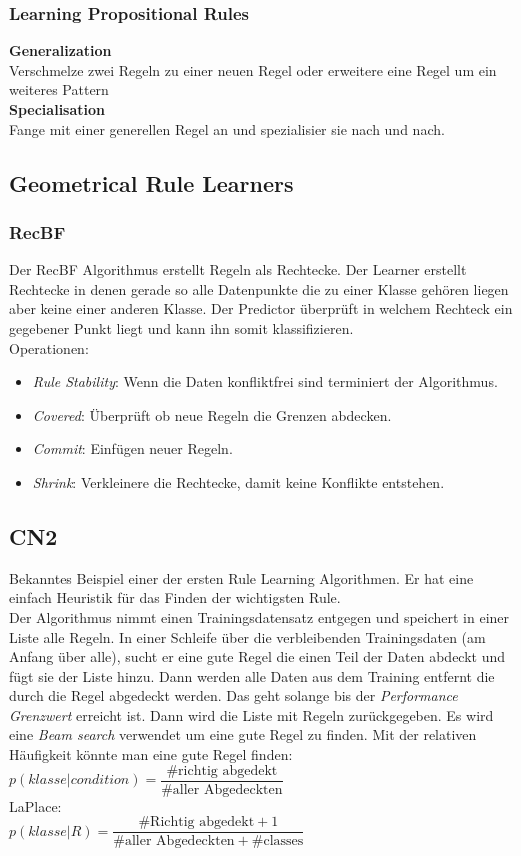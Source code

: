 \documentclass[a4paper]{scrartcl}
\begin{document}
\subsubsection{Learning Propositional Rules}
\textbf{Generalization}\\
Verschmelze zwei Regeln zu einer neuen Regel oder erweitere eine Regel um ein weiteres Pattern\\
\textbf{Specialisation}\\
Fange mit einer generellen Regel an und spezialisier sie nach und nach.

\subsection{Geometrical Rule Learners}
\subsubsection{RecBF}
Der RecBF Algorithmus erstellt Regeln als Rechtecke. Der Learner erstellt Rechtecke in denen gerade so alle Datenpunkte die zu einer Klasse gehören liegen aber keine einer anderen Klasse. Der Predictor überprüft in welchem Rechteck ein gegebener Punkt liegt und kann ihn somit klassifizieren.\\
Operationen:
\begin{itemize}
\setlength{\parskip}{-2pt}
\item \textit{Rule Stability}: Wenn die Daten konfliktfrei sind terminiert der Algorithmus.
\item \textit{Covered}: Überprüft ob neue Regeln die Grenzen abdecken.
\item \textit{Commit}: Einfügen neuer Regeln.
\item \textit{Shrink}: Verkleinere die Rechtecke, damit keine Konflikte entstehen.
\end{itemize}

\subsection{CN2}
Bekanntes Beispiel einer der ersten Rule Learning Algorithmen. Er hat eine einfach Heuristik für das Finden der wichtigsten Rule.\\
Der Algorithmus nimmt einen Trainingsdatensatz entgegen und speichert in einer Liste alle Regeln. 
In einer Schleife über die verbleibenden Trainingsdaten (am Anfang über alle), sucht er eine gute Regel die einen Teil der Daten abdeckt und fügt sie der Liste hinzu. Dann werden alle Daten aus dem Training entfernt die durch die Regel abgedeckt werden. Das geht solange bis der \textit{Performance Grenzwert} erreicht ist. Dann wird die Liste mit Regeln zurückgegeben. Es wird eine \textit{Beam search} verwendet um eine gute Regel zu finden. Mit der relativen Häufigkeit könnte man eine gute Regel finden:\\
$p(klasse|condition) = \dfrac{\#\mbox{richtig abgedekt}}{\#\mbox{aller Abgedeckten}}$\\
LaPlace:\\
$p(klasse|R) = \dfrac{\#\mbox{Richtig abgedekt} +1}{\#\mbox{aller Abgedeckten}+\#\mbox{classes}}$\\
\end{document}
